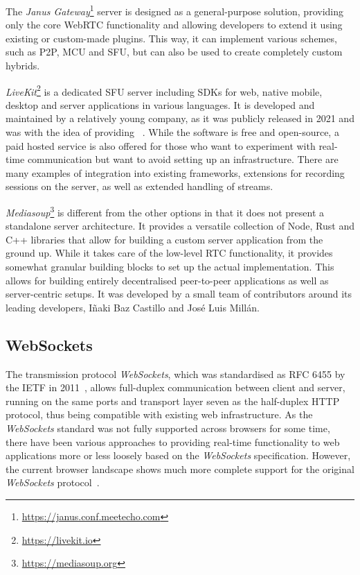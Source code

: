 The \emph{Janus Gateway}\footnote{\url{https://janus.conf.meetecho.com}} server is designed as a general-purpose solution, providing only the core \ac{WebRTC} functionality and allowing developers to extend it using existing or custom-made plugins.
This way, it can implement various schemes, such as \ac{P2P}, \ac{MCU} and \ac{SFU}, but can also be used to create completely custom hybrids.

\emph{LiveKit}\footnote{\url{https://livekit.io}} is a dedicated \ac{SFU} server including \ac{SDK}s for web, native mobile, desktop and server applications in various languages.
It is developed and maintained by a relatively young company, as it was publicly released in 2021 and was  with the idea of providing ~\parencite{livekitAbout}.
While the software is free and open-source, a paid hosted service is also offered for those who want to experiment with real-time communication but want to avoid setting up an infrastructure.
There are many examples of integration into existing frameworks, extensions for recording sessions on the server, as well as extended handling of streams.

\emph{Mediasoup}\footnote{\url{https://mediasoup.org}} is different from the other options in that it does not present a standalone server architecture.
It provides a versatile collection of Node, Rust and C++ libraries that allow for building a custom server application from the ground up.
While it takes care of the low-level \ac{RTC} functionality, it provides somewhat granular building blocks to set up the actual implementation.
This allows for building entirely decentralised peer-to-peer applications as well as server-centric setups.
It was developed by a small team of contributors around its leading developers, Iñaki Baz Castillo and José Luis Millán.

\subsection{WebSockets}
\label{subsec:websockets}

The transmission protocol \emph{WebSockets}, which was standardised as \ac{RFC} 6455 by the \ac{IETF} in 2011~\parencite{webSocketsProtocolRfc}, allows full-duplex communication between client and server, running on the same ports and transport layer seven as the half-duplex \ac{HTTP} protocol, thus being compatible with existing web infrastructure.
As the \emph{WebSockets} standard was not fully supported across browsers for some time, there have been various approaches to providing real-time functionality to web applications more or less loosely based on the \emph{WebSockets} specification.
However, the current browser landscape shows much more complete support for the original \emph{WebSockets} protocol~\parencite{canIUseWebSockets}.

